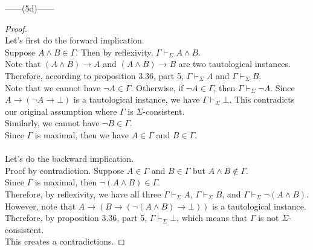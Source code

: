 \documentclass[12pt]{article}
\newcommand{\dr}{\vdash_{\Sigma}}
\begin{document}
\noindent
\begin{center}
    ------(5d)------
\end{center} 
\begin{proof}$ $\\
    Let's first do the forward implication. \\
    Suppose $A \land B \in \Gamma$.
    Then by reflexivity, $\Gamma \dr A \land B$.\\
    Note that $(A \land B) \to A$ and $(A \land B) \to B$ are two tautological instances.\\
    Therefore, according to proposition 3.36, part 5, $\Gamma \dr A$ and $\Gamma \dr B$.\\
    Note that we cannot have $\neg A \in \Gamma$.
    Otherwise, if $\neg A \in \Gamma$, then $\Gamma \dr \neg A$. 
    Since $A \to (\neg A \to \bot)$ is a tautological instance, we have $\Gamma \dr \bot$.
    This contradicts our original assumption where $\Gamma$ is $\Sigma$-consistent.\\
    Similarly, we cannot have $\neg B \in \Gamma$.\\
    Since $\Gamma$ is maximal, then we have $A \in \Gamma$ and $B \in \Gamma$.\\
    \\
    Let's do the backward implication.\\
    Proof by contradiction. Suppose $A \in \Gamma$ and $B \in \Gamma$ but $A \land B \notin \Gamma$.\\
    Since $\Gamma$ is maximal, then $\neg(A \land B) \in \Gamma$.\\
    Therefore, by reflexivity, we have all three $\Gamma \dr A$, $\Gamma \dr B$, and $\Gamma \dr \neg (A \land B)$.\\
    However, note that $A \to (B \to (\neg(A \land B) \to \bot))$ is a tautological instance.\\
    Therefore, by proposition 3.36, part 5, $\Gamma \dr \bot$, which means that $\Gamma$ is not $\Sigma$-consistent.\\
    This creates a contradictions.
    
\end{proof}
\end{document}
